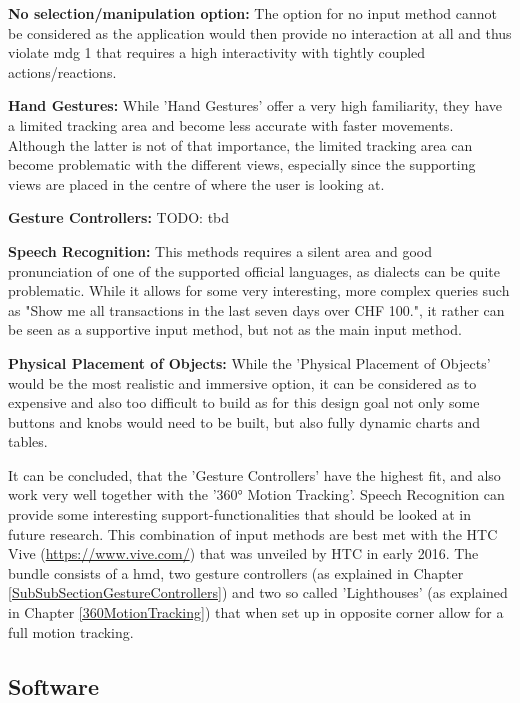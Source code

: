 \textbf{No selection/manipulation option:}
The option for no input method cannot be considered as the application would then provide no interaction at all and thus violate \gls{mdg} 1 that requires a high interactivity with tightly coupled actions/reactions.

\textbf{Hand Gestures:}
While 'Hand Gestures' offer a very high familiarity, they have a limited tracking area and become less accurate with faster movements. Although the latter is not of that importance, the limited tracking area can become problematic with the different views, especially since the supporting views are placed in the centre of where the user is looking at.

\textbf{Gesture Controllers:}
TODO: tbd

\textbf{Speech Recognition:}
This methods requires a silent area and good pronunciation of one of the supported official languages, as dialects can be quite problematic. While it allows for some very interesting, more complex queries such as "Show me all transactions in the last seven days over CHF 100.", it rather can be seen as a supportive input method, but not as the main input method.

\textbf{Physical Placement of Objects:}
While the 'Physical Placement of Objects' would be the most realistic and immersive option, it can be considered as to expensive and also too difficult to build as for this design goal not only some buttons and knobs would need to be built, but also fully dynamic charts and tables.


It can be concluded, that the 'Gesture Controllers' have the highest fit, and also work very well together with the '360° Motion Tracking'. Speech Recognition can provide some interesting support-functionalities that should be looked at in future research. \newline
This combination of input methods are best met with the HTC Vive (\url{https://www.vive.com/}) that was unveiled by HTC in early 2016. The bundle consists of a \gls{hmd}, two gesture controllers (as explained in Chapter \ref{SubSubSectionGestureControllers}) and two so called 'Lighthouses' (as explained in Chapter \ref{360MotionTracking}) that when set up in opposite corner allow for a full motion tracking.



\subsection{Software}

